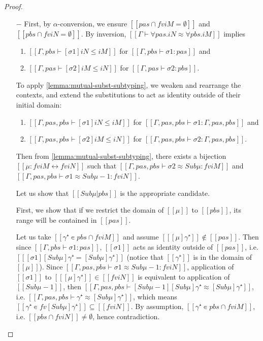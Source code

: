 \lemmaPolyTypesEquivalence*
\begin{proof}
    \hfill
  \begin{itemize}
    \item[$-$]
      First, by $\alpha$-conversion, we ensure $[[{pas} ∩ fv iM = ∅]]$ and $[[{pbs} ∩ fv iN = ∅]]$.
      By inversion, $[[Γ ⊢ ∀pas.iN ≈ ∀pbs.iM ]]$ implies 
      \begin{enumerate} 
        \item $[[Γ,pbs ⊢ [σ1]iN ≤ iM]]$ for $[[ Γ,pbs ⊢ σ1 :{pas} ]]$ and 
        \item $[[Γ,pas ⊢ [σ2]iM ≤ iN]]$ for $[[ Γ,pas ⊢ σ2 : {pbs} ]]$.
      \end{enumerate}
      To apply \cref{lemma:mutual-subst-subtyping}, we weaken 
      and rearrange the contexts, and extend the substitutions to act as identity
      outside of their initial domain:
      \begin{enumerate} 
        \item $[[Γ, {pas}, {pbs} ⊢ [σ1]iN ≤ iM]]$ for $[[ Γ, {pas}, {pbs} ⊢ σ1 : Γ, {pas}, {pbs} ]]$ and 
        \item $[[Γ, {pas}, {pbs} ⊢ [σ2]iM ≤ iN]]$ for $[[ Γ, {pas}, {pbs} ⊢ σ2 : Γ, {pas}, {pbs} ]]$.
      \end{enumerate}
      Then from \cref{lemma:mutual-subst-subtyping}, 
      there exists a bijection $[[μ : fv iM ↔ fv iN]]$ such that 
      $[[Γ, {pas}, {pbs} ⊢ σ2 ≈ Sub μ :  fv iM]]$ and 
      $[[Γ, {pas}, {pbs} ⊢ σ1 ≈ Sub μ-1 :  fv iN]]$. 

      Let us show that $[[Sub μ|{pbs}]]$ is the appropriate candidate.

      First, we show that if we restrict the domain of $[[μ]]$ to 
      $[[pbs]]$, its range will be contained in $[[pas]]$.

      Let us take $[[γ⁺ ∊ {pbs} ∩ fv iM]]$ and 
      assume $[[ [μ]γ⁺]] \notin [[pas]]$.
      Then since $[[ Γ,pbs ⊢ σ1 :{pas} ]]$, 
      $[[σ1]]$ acts as identity outside of $[[pas]]$, i.e.
      $[[ [σ1][Sub μ]γ⁺ = [Sub μ]γ⁺ ]]$ (notice that $[[γ⁺]]$ is in the domain of $[[μ]]$).
      Since
      $[[Γ, {pas}, {pbs} ⊢ σ1 ≈ Sub μ-1 :  fv iN]]$, 
      application of $[[σ1]]$ to $[[ [μ]γ⁺ ]] \in [[fv iN]]$
      is equivalent to application of $[[Sub μ-1]]$, then 
      $[[ Γ, {pas}, {pbs} ⊢ [Sub μ-1][Sub μ]γ⁺ ≈ [Sub μ]γ⁺ ]]$, i.e.
      $[[Γ, {pas}, {pbs} ⊢ γ⁺ ≈ [Sub μ]γ⁺]]$, 
      which means $[[γ⁺ ∊ fv [Sub μ]γ⁺]] \subseteq [[fv iN]]$.
      By assumption, $[[γ⁺ ∊ {pbs} ∩ fv iM]]$, i.e. $[[{pbs} ∩ fv iN]] \neq \emptyset$, hence contradiction.


\end{itemize}
\end{proof}
